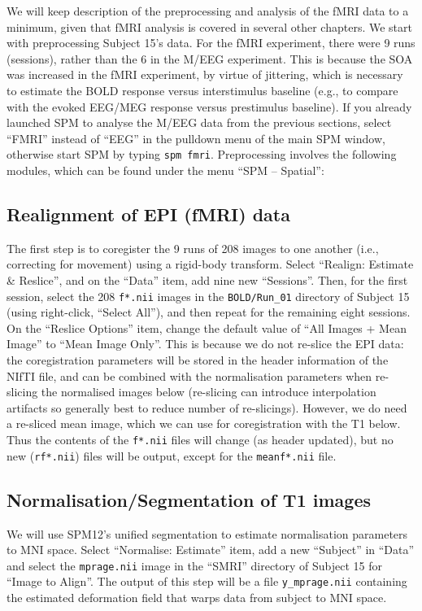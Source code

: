 We will keep description of the preprocessing and analysis of the fMRI data to a minimum, given that fMRI analysis is covered in several other chapters. We start with preprocessing Subject 15's data. For the fMRI experiment, there were 9 runs (sessions), rather than the 6 in the M/EEG experiment. This is because the SOA was increased in the fMRI experiment, by virtue of jittering, which is necessary to estimate the BOLD response versus interstimulus baseline (e.g., to compare with the evoked EEG/MEG response versus prestimulus baseline). If you already launched SPM to analyse the M/EEG data from the previous sections, select ``FMRI'' instead of ``EEG'' in the pulldown menu of the main SPM window, otherwise start SPM by typing \texttt{spm fmri}. Preprocessing involves the following modules, which can be found under the menu ``SPM -- Spatial'':

\subsection{Realignment of EPI (fMRI) data}

The first step is to coregister the 9 runs of 208 images to one another (i.e., correcting for movement) using a rigid-body transform. Select ``Realign: Estimate \& Reslice'', and on the ``Data'' item, add nine new ``Sessions''. Then, for the first session, select the 208 \texttt{f*.nii} images in the \texttt{BOLD/Run\_01} directory of Subject 15 (using right-click, ``Select All''), and then repeat for the remaining eight sessions. On the ``Reslice Options'' item, change the default value of ``All Images + Mean Image'' to ``Mean Image Only''. This is because we do not re-slice the EPI data: the coregistration parameters will be stored in the header information of the NIfTI file, and can be combined with the normalisation parameters when re-slicing the normalised images below (re-slicing can introduce interpolation artifacts so generally best to reduce number of re-slicings). However, we do need a re-sliced mean image, which we can use for coregistration with the T1 below. Thus the contents of the \texttt{f*.nii} files will change (as header updated), but no new (\texttt{rf*.nii}) files will be output, except for the \texttt{meanf*.nii} file.

\subsection{Normalisation/Segmentation of T1 images}

We will use SPM12's unified segmentation to estimate normalisation parameters to MNI space. Select ``Normalise: Estimate'' item, add a new ``Subject'' in ``Data'' and select the \texttt{mprage.nii} image in the ``SMRI'' directory of Subject 15 for ``Image to Align''. The output of this step will be a file \texttt{y\_mprage.nii} containing the estimated deformation field that warps data from subject to MNI space.

